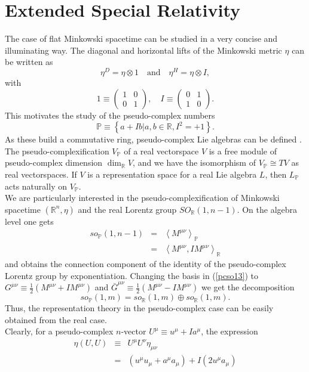 \documentclass[11pt,a4paper,twoside]{article}
\newcommand{\reals}{\mathbb{R}}
\newcommand{\pc}{\mathbb{P}}
\begin{document}
\section{Extended Special Relativity}
The case of flat Minkowski spacetime can be studied in a very concise
and illuminating way. The diagonal and horizontal lifts of the
Minkowski metric $\eta$ can be written
as
$$\eta^D = \eta \otimes 1 \quad \textrm{and} \quad \eta^H = \eta
  \otimes I,$$
with
\begin{equation}
  1 \equiv \left(\begin{array}{cc} 1 & 0 \\ 0 & 1
  \end{array}\right), \quad
  I \equiv \left(\begin{array}{cc} 0 & 1 \\ 1 & 0
  \end{array}\right).
\end{equation}
This motivates the study of the pseudo-complex
numbers
$$\pc \equiv \left\{a + I b | a,b \in \reals, I^2=+1\right\}.$$
As these build a commutative ring, pseudo-complex Lie algebras can be
defined \cite{Lang}. The pseudo-complexification $V_\pc$ of a real vectorspace
$V$ is a free module of pseudo-complex dimension $\dim_\reals V$, and we
have the isomorphism of $V_\pc \cong TV$ as real vectorspaces. If $V$ is
a representation space for a real Lie algebra $L$, then $L_\pc$ acts
naturally on $V_\pc$.\\
We are particularly interested in the pseudo-complexification of
Minkowski spacetime $(\reals^n,\eta)$ and the real Lorentz group
$SO_\reals(1,n-1)$. On the algebra level one gets
\begin{eqnarray}\label{pcso13}
  so_\pc(1,n-1) &=& \left<M^{\mu\nu}\right>_\pc\\
                &=& \left<M^{\mu\nu}, I M^{\mu\nu}\right>_\reals\nonumber
\end{eqnarray}
and obtains the connection component of the identity of the
pseudo-complex Lorentz group by exponentiation. Changing the basis in
(\ref{pcso13}) to $G^{\mu\nu}\equiv \frac{1}{2}(M^{\mu\nu} + I  M^{\mu\nu})$ and
$\bar G^{\mu\nu} \equiv \frac{1}{2}(M^{\mu\nu} - I  M^{\mu\nu})$ we get the
decomposition
$$
  so_\pc(1,m) = so_\reals(1,m) \oplus so_\reals(1,m).
$$
Thus, the representation theory in the pseudo-complex case can be
easily obtained from the real case.\\
Clearly, for a pseudo-complex $n$-vector $U^\mu \equiv u^\mu + I a^\mu$, the expression
\begin{eqnarray}
  \eta(U,U) &\equiv& U^\mu U^\nu \eta_{\mu\nu}\\
            &=& (u^\mu u_\mu + a^\mu a_\mu) + I (2 u^\mu a_\mu)\nonumber
\end{eqnarray}
\end{document}
